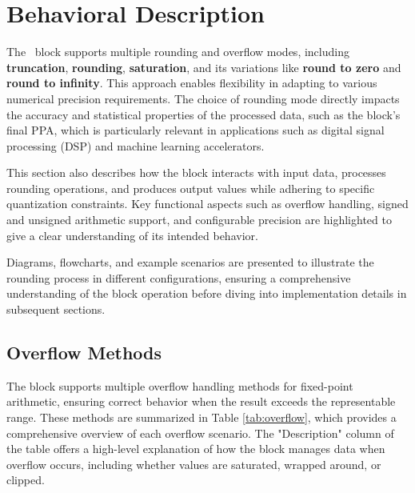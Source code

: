 
\section{Behavioral Description}
\label{sec:behavioral_description}

The \blockname\ block supports multiple rounding and overflow modes, including \textbf{truncation}, \textbf{rounding}, \textbf{saturation}, and its variations like \textbf{round to zero} and \textbf{round to infinity}. This approach enables flexibility in adapting to various numerical precision requirements. The choice of rounding mode directly impacts the accuracy and statistical properties of the processed data, such as the block's final PPA, which is particularly relevant in applications such as digital signal processing (DSP) and machine learning accelerators.

This section also describes how the block interacts with input data, processes rounding operations, and produces output values while adhering to specific quantization constraints. Key functional aspects such as overflow handling, signed and unsigned arithmetic support, and configurable precision are highlighted to give a clear understanding of its intended behavior.

Diagrams, flowcharts, and example scenarios are presented to illustrate the rounding process in different configurations, ensuring a comprehensive understanding of the block operation before diving into implementation details in subsequent sections.

\subsection{Overflow Methods}
\label{sec:overflow}
The block supports multiple overflow handling methods for fixed-point arithmetic, ensuring correct behavior when the result exceeds the representable range. These methods are summarized in Table \ref{tab:overflow}, which provides a comprehensive overview of each overflow scenario. The "Description" column of the table offers a high-level explanation of how the block manages data when overflow occurs, including whether values are saturated, wrapped around, or clipped.

